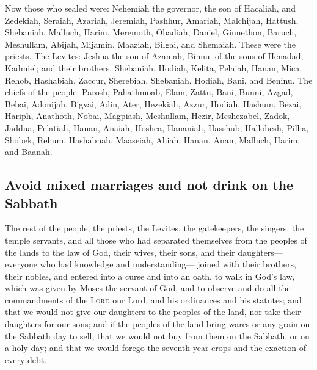  Now those who sealed were: Nehemiah the governor, the son
of Hacaliah, and Zedekiah,  Seraiah, Azariah, Jeremiah,
 Pashhur, Amariah, Malchijah,  Hattush,
Shebaniah, Malluch,  Harim, Meremoth, Obadiah,
 Daniel, Ginnethon, Baruch,  Meshullam,
Abijah, Mijamin,  Maaziah, Bilgai, and Shemaiah. These
were the priests.  The Levites: Jeshua the son of Azaniah,
Binnui of the sons of Henadad, Kadmiel;  and their
brothers, Shebaniah, Hodiah, Kelita, Pelaiah, Hanan, 
Mica, Rehob, Hashabiah,  Zaccur, Sherebiah, Shebaniah,
 Hodiah, Bani, and Beninu.  The chiefs of
the people: Parosh, Pahathmoab, Elam, Zattu, Bani, 
Bunni, Azgad, Bebai,  Adonijah, Bigvai, Adin,
 Ater, Hezekiah, Azzur,  Hodiah, Hashum,
Bezai,  Hariph, Anathoth, Nobai, 
Magpiash, Meshullam, Hezir,  Meshezabel, Zadok, Jaddua,
 Pelatiah, Hanan, Anaiah,  Hoshea,
Hananiah, Hasshub,  Hallohesh, Pilha, Shobek,
 Rehum, Hashabnah, Maaseiah,  Ahiah,
Hanan, Anan,  Malluch, Harim, and Baanah.

\hypertarget{avoid-mixed-marriages-and-not-drink-on-the-sabbath}{%
\subsection{Avoid mixed marriages and not drink on the
Sabbath}\label{avoid-mixed-marriages-and-not-drink-on-the-sabbath}}

 The rest of the people, the priests, the Levites, the
gatekeepers, the singers, the temple servants, and all those who had
separated themselves from the peoples of the lands to the law of God,
their wives, their sons, and their daughters---everyone who had
knowledge and understanding---  joined with their
brothers, their nobles, and entered into a curse and into an oath, to
walk in God's law, which was given by Moses the servant of God, and to
observe and do all the commandments of the \textsc{Lord} our Lord, and
his ordinances and his statutes;  and that we would not
give our daughters to the peoples of the land, nor take their daughters
for our sons;  and if the peoples of the land bring wares
or any grain on the Sabbath day to sell, that we would not buy from them
on the Sabbath, or on a holy day; and that we would forego the seventh
year crops and the exaction of every debt.

